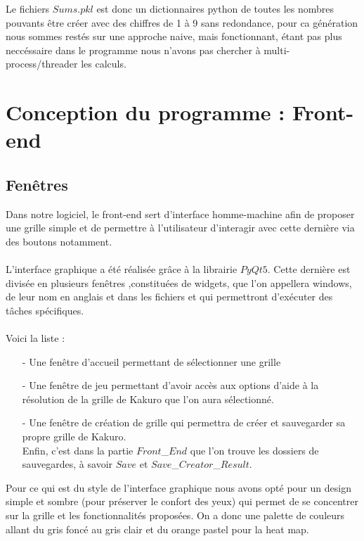\documentclass[french,12pt]{article}
\begin{document}
Le fichiers $Sums.pkl$ est donc un dictionnaires python de toutes les nombres pouvants être créer avec des chiffres de 1 à 9 sans redondance, pour ca génération nous sommes restés sur une approche naive, mais fonctionnant, étant pas plus neccéssaire dans le programme nous n'avons pas chercher à multi- process/threader les calculs.





\newpage
\section{Conception du programme : Front-end}
\subsection{Fenêtres}
Dans notre logiciel, le front-end sert d'interface homme-machine afin de proposer une grille simple et de permettre à l'utilisateur d'interagir avec cette dernière via des boutons notamment. \\ \\
L'interface graphique a été réalisée grâce à la librairie $PyQt5$. Cette dernière est divisée en plusieurs fenêtres ,constituées de widgets, que l'on appellera windows, de leur nom en anglais et dans les fichiers et qui permettront d'exécuter des tâches spécifiques. \\ \\
Voici la liste : \\

\begin{enumerate}
	\item[-] Une fenêtre d'accueil permettant de sélectionner une grille  \\
	\item[-] Une fenêtre de jeu permettant d'avoir accès aux options d'aide à la 				résolution de la grille de Kakuro que l'on aura sélectionné. \\
	\item[-] Une fenêtre de création de grille qui permettra de créer et sauvegarder sa 		propre grille de Kakuro. \\
	Enfin, c'est dans la partie $Front$\_$End$ que l'on trouve les dossiers de 					sauvegardes, à savoir $Save$ et $Save$\_$Creator$\_$Result$. \\
\end{enumerate}

Pour ce qui est du style de l'interface graphique nous avons opté pour un design simple et sombre (pour préserver le confort des yeux) qui permet de se concentrer sur la grille et les fonctionnalités proposées. On a donc une palette de couleurs allant du gris foncé au gris clair et du orange pastel pour la heat map.
\newpage
\end{document}
